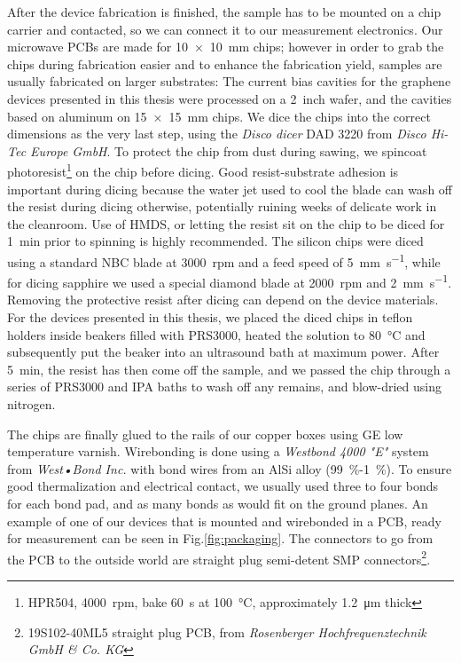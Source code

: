 After the device fabrication is finished, the sample has to be mounted on a chip carrier and contacted, so we can connect it to our measurement electronics.
Our microwave PCBs are made for \SI{10x10}{\milli\meter} chips; however in order to grab the chips during fabrication easier and to enhance the fabrication yield, samples are usually fabricated on larger substrates:
The current bias cavities for the graphene devices presented in this thesis were processed on a \SI{2}{inch} wafer, and the cavities based on aluminum on \SI{15x15}{\milli\meter} chips.
We dice the chips into the correct dimensions as the very last step, using the \textit{Disco dicer} DAD 3220 from \textit{Disco Hi-Tec Europe GmbH}.
To protect the chip from dust during sawing, we spincoat photoresist\footnote{HPR504, \SI{4000}{rpm}, bake \SI{60}{\second} at \SI{100}{\celsius}, approximately \SI{1.2}{\micro\meter} thick} on the chip before dicing.
Good resist-substrate adhesion is important during dicing because the water jet used to cool the blade can wash off the resist during dicing otherwise, potentially ruining weeks of delicate work in the cleanroom.
Use of HMDS, or letting the resist sit on the chip to be diced for \SI{1}{\minute} prior to spinning is highly recommended.
The silicon chips were diced using a standard NBC blade at \SI{3000}{rpm} and a feed speed of \SI{5}{\milli\meter\per\second}, while for dicing sapphire we used a special diamond blade at \SI{2000}{rpm} and \SI{2}{\milli\meter\per\second}.
Removing the protective resist after dicing can depend on the device materials.
For the devices presented in this thesis, we placed the diced chips in teflon holders inside beakers filled with PRS3000, heated the solution to \SI{80}{\celsius} and subsequently put the beaker into an ultrasound bath at maximum power.
After \SI{5}{\minute}, the resist has then come off the sample, and we passed the chip through a series of PRS3000 and IPA baths to wash off any remains, and blow-dried using nitrogen.

The chips are finally glued to the rails of our copper boxes using GE low temperature varnish.
Wirebonding is done using a \textit{Westbond 4000 "E"} system from \textit{West•Bond Inc.} with bond wires from an AlSi alloy (\SI{99}{\percent}-\SI{1}{\percent}).
To ensure good thermalization and electrical contact, we usually used three to four bonds for each bond pad, and as many bonds as would fit on the ground planes.
An example of one of our devices that is mounted and wirebonded in a PCB, ready for measurement can be seen in Fig.\ref{fig:packaging}.
The connectors to go from the PCB to the outside world are straight plug semi-detent SMP connectors\footnote{19S102-40ML5 straight plug PCB, from \textit{Rosenberger Hochfrequenztechnik GmbH \& Co. KG}}.




